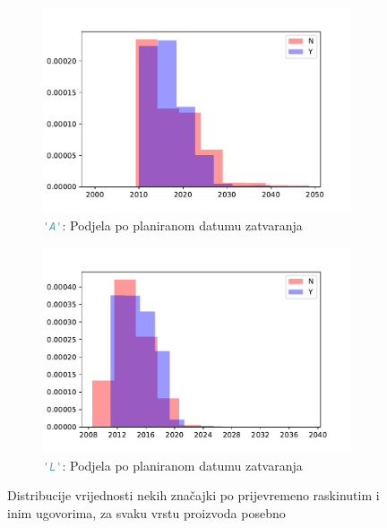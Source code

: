 \documentclass[paper = a4, fontsize = 11pt, DIV = 12, BCOR = 0pt, headings = standardclasses, numbers = endperiod]{scrartcl}
\begin{document}
\begin{figure}[htb!]
		\begin{subfigure}{0.4\textwidth}
			\centering
			\includegraphics[width = \textwidth]{planirani_datum_zatvaranja_A.pdf}
			\caption{\lstinline[language = Python, style = lijepo]{'A'}: Podjela po planiranom datumu zatvaranja}
		\end{subfigure}
		\hfill
		\begin{subfigure}{0.4\textwidth}
			\centering
			\includegraphics[width = \textwidth]{planirani_datum_zatvaranja_L.pdf}
			\caption{\lstinline[language = Python, style = lijepo]{'L'}: Podjela po planiranom datumu zatvaranja}
		\end{subfigure}
		
		\par
		
		\caption[Distribucije vrijednosti nekih značajki]{Distribucije vrijednosti nekih značajki po prijevremeno raskinutim i inim ugovorima, za svaku vrstu proizvoda posebno}
		\label{fig:histogrami}
	\end{figure}
\end{document}
